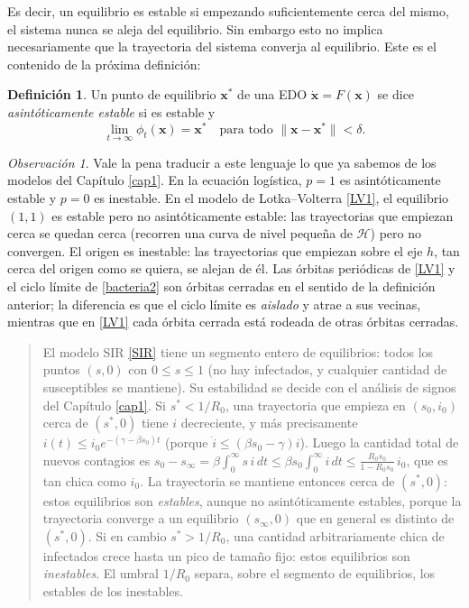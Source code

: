 \documentclass[12pt, a4paper]{amsbook}
\newcommand{\Hc}{{\mathcal H}}
\newcommand{\xx}{{\mathbf x}}
\theoremstyle{remark}
\newtheorem{obs}[teo]{Observación}
\theoremstyle{definition}
\newtheorem{defi}[teo]{Definición}
\numberwithin{section}{chapter}
\numberwithin{subsection}{section}
\numberwithin{equation}{section}
\numberwithin{figure}{chapter}
\newenvironment{volvemos}[1]{\medskip\par\noindent\begin{quote}\noindent{\bf Volvemos al problema: #1.}\par\smallskip}{\end{quote}\medskip}
\begin{document}
Es decir, un equilibrio es estable si empezando suficientemente cerca del mismo, el sistema nunca se aleja del equilibrio. Sin embargo esto no implica necesariamente que la trayectoria del sistema converja al equilibrio. Este es el contenido de la próxima definición:
\begin{defi}
Un punto de equilibrio $\xx^*$ de una EDO $\dot\xx = F(\xx)$ se dice {\em asintóticamente estable} si es estable y
$$
\lim_{t\to\infty}\phi_t(\xx) = \xx^* \quad \text{para todo } \|\xx-\xx^*\|<\delta.
$$
\end{defi}

\begin{obs}
Vale la pena traducir a este lenguaje lo que ya sabemos de los modelos del Capítulo \ref{cap1}. En la ecuación logística, $p=1$ es asintóticamente estable y $p=0$ es inestable. En el modelo de Lotka--Volterra \eqref{LV1}, el equilibrio $(1,1)$ es estable pero no asintóticamente estable: las trayectorias que empiezan cerca se quedan cerca (recorren una curva de nivel pequeña de $\Hc$) pero no convergen. El origen es inestable: las trayectorias que empiezan sobre el eje $h$, tan cerca del origen como se quiera, se alejan de él. Las órbitas periódicas de \eqref{LV1} y el ciclo límite de \eqref{bacteria2} son órbitas cerradas en el sentido de la definición anterior; la diferencia es que el ciclo límite es \emph{aislado} y atrae a sus vecinas, mientras que en \eqref{LV1} cada órbita cerrada está rodeada de otras órbitas cerradas.
\end{obs}

\begin{volvemos}{la epidemia}
El modelo SIR \eqref{SIR} tiene un segmento entero de equilibrios: todos los puntos $(s,0)$ con $0\le s\le 1$ (no hay infectados, y cualquier cantidad de susceptibles se mantiene). Su estabilidad se decide con el análisis de signos del Capítulo \ref{cap1}. Si $s^*<1/R_0$, una trayectoria que empieza en $(s_0,i_0)$ cerca de $(s^*,0)$ tiene $i$ decreciente, y más precisamente $i(t)\le i_0 e^{-(\gamma-\beta s_0)t}$ (porque $\dot i\le (\beta s_0-\gamma)i$). Luego la cantidad total de nuevos contagios es $s_0-s_\infty = \beta\int_0^\infty s\,i\,dt\le \beta s_0\int_0^\infty i\,dt\le \frac{R_0 s_0}{1-R_0 s_0}\,i_0$, que es tan chica como $i_0$. La trayectoria se mantiene entonces cerca de $(s^*,0)$: estos equilibrios son \emph{estables}, aunque no asintóticamente estables, porque la trayectoria converge a un equilibrio $(s_\infty,0)$ que en general es distinto de $(s^*,0)$. Si en cambio $s^*>1/R_0$, una cantidad arbitrariamente chica de infectados crece hasta un pico de tamaño fijo: estos equilibrios son \emph{inestables}. El umbral $1/R_0$ separa, sobre el segmento de equilibrios, los estables de los inestables.
\end{volvemos}
\end{document}
